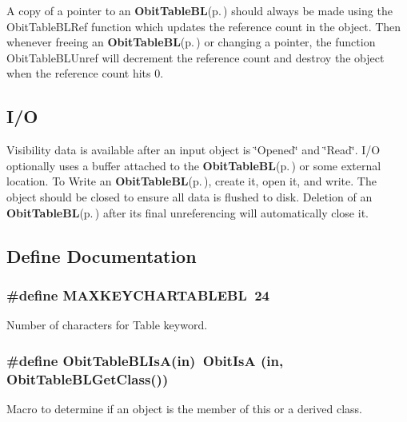 A copy of a pointer to an {\bf Obit\-Table\-BL}{\rm (p.\,\pageref{structObitTableBL})} should always be made using the Obit\-Table\-BLRef function which updates the reference count in the object. Then whenever freeing an {\bf Obit\-Table\-BL}{\rm (p.\,\pageref{structObitTableBL})} or changing a pointer, the function Obit\-Table\-BLUnref will decrement the reference count and destroy the object when the reference count hits 0.\subsection{I/O}\label{ObitTableBL_8h_ObitTableBLUsage}
Visibility data is available after an input object is \char`\"{}Opened\char`\"{} and \char`\"{}Read\char`\"{}. I/O optionally uses a buffer attached to the {\bf Obit\-Table\-BL}{\rm (p.\,\pageref{structObitTableBL})} or some external location. To Write an {\bf Obit\-Table\-BL}{\rm (p.\,\pageref{structObitTableBL})}, create it, open it, and write. The object should be closed to ensure all data is flushed to disk. Deletion of an {\bf Obit\-Table\-BL}{\rm (p.\,\pageref{structObitTableBL})} after its final unreferencing will automatically close it.

\subsection{Define Documentation}
\subsubsection{\setlength{\rightskip}{0pt plus 5cm}\#define MAXKEYCHARTABLEBL\ 24}\label{ObitTableBL_8h_a0}


Number of characters for Table keyword. 

\subsubsection{\setlength{\rightskip}{0pt plus 5cm}\#define Obit\-Table\-BLIs\-A(in)\ Obit\-Is\-A (in, Obit\-Table\-BLGet\-Class())}\label{ObitTableBL_8h_a3}


Macro to determine if an object is the member of this or a derived class. 

